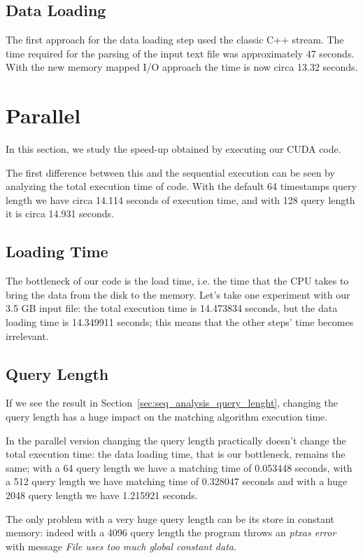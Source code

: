\subsection{Data Loading}
The first approach for the data loading step used the classic C++ stream. The time required for the parsing of the input text file was approximately 47 seconds. With the new memory mapped I/O approach the time is now circa 13.32 seconds.

\section{Parallel}
In this section, we study the speed-up obtained by executing our CUDA code.

The first difference between this and the sequential execution can be seen by analyzing the total execution time of code. With the default 64 timestamps query length we have circa 14.114 seconds of execution time, and with 128 query length it is circa 14.931 seconds.

\subsection{Loading Time}
The bottleneck of our code is the load time, i.e. the time that the CPU takes to bring the data from the disk to the memory. Let's take one experiment with our 3.5 GB input file: the total execution time is 14.473834 seconds, but the data loading time is 14.349911 seconds; this means that the other steps' time becomes irrelevant.

\subsection{Query Length}
If we see the result in Section~\ref{sec:seq_analysis_query_lenght}, changing the query length has a huge impact on the matching algorithm execution time.

In the parallel version changing the query length practically doesn't change the total execution time: the data loading time, that is our bottleneck, remains the same; with a 64 query length we have a matching time of 0.053448 seconds, with a 512 query length we have matching time of 0.328047 seconds and with a huge 2048 query length we have 1.215921 seconds.

The only problem with a very huge query length can be its store in constant memory: indeed with a 4096 query length the program throws an \textit{ptxas error} with message \textit{File uses too much global constant data}.

